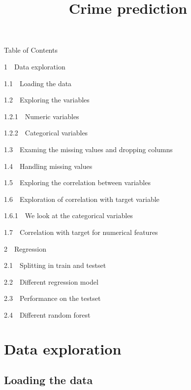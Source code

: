 \documentclass[11pt]{llncs}
\title{Crime prediction}
\begin{document}
    
    
    \maketitle
    
    

    
    Table of Contents{}

{{1~~}Data exploration}

{{1.1~~}Loading the data}

{{1.2~~}Exploring the variables}

{{1.2.1~~}Numeric variables}

{{1.2.2~~}Categorical variables}

{{1.3~~}Examing the missing values and dropping columns}

{{1.4~~}Handling missing values}

{{1.5~~}Exploring the correlation between variables}

{{1.6~~}Exploration of correlation with target variable}

{{1.6.1~~}We look at the categorical variables}

{{1.7~~}Correlation with target for numerical features}

{{2~~}Regression}

{{2.1~~}Splitting in train and testset}

{{2.2~~}Different regression model}

{{2.3~~}Performance on the testset}

{{2.4~~}Different random forest}

    \section{Data exploration}\label{data-exploration}

    \subsection{Loading the data}\label{loading-the-data}
\end{document}
